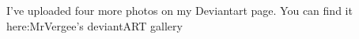 I've uploaded four more photos on my Deviantart page. You can find it here:MrVergee's deviantART gallery 